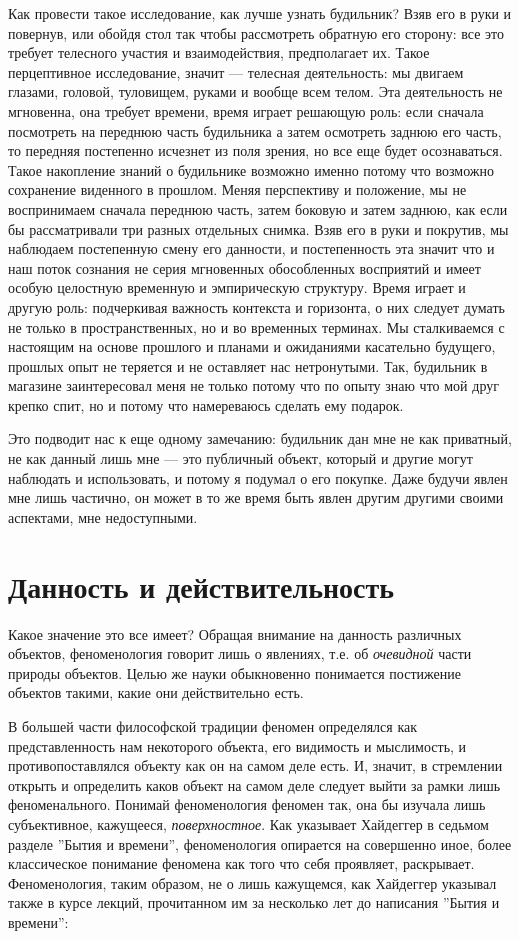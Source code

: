 \documentclass[11pt]{book}
\begin{document}
Как провести такое исследование, как лучше узнать будильник? Взяв его в руки и повернув, или обойдя стол так чтобы рассмотреть обратную его сторону: все это требует телесного участия и взаимодействия, предполагает их. Такое перцептивное исследование, значит --- телесная деятельность: мы двигаем глазами, головой, туловищем, руками и вообще всем телом. Эта деятельность не мгновенна, она требует времени, время играет решающую роль: если сначала посмотреть на переднюю часть будильника а затем осмотреть заднюю его часть, то передняя постепенно исчезнет из поля зрения, но все еще будет осознаваться. Такое накопление знаний о будильнике возможно именно потому что возможно сохранение виденного в прошлом. Меняя перспективу и положение, мы не воспринимаем сначала переднюю часть, затем боковую и затем заднюю, как если бы рассматривали три разных отдельных снимка. Взяв его в руки и покрутив, мы наблюдаем постепенную смену его данности, и постепенность эта значит что и наш поток сознания не серия мгновенных обособленных восприятий и имеет особую целостную временную и эмпирическую структуру. Время играет и другую роль: подчеркивая важность контекста и горизонта, о них следует думать не только в пространственных, но и во временных терминах. Мы сталкиваемся с настоящим на основе прошлого и планами и ожиданиями касательно будущего, прошлых опыт не теряется и не оставляет нас нетронутыми. Так, будильник в магазине заинтересовал меня не только потому что по опыту знаю что мой друг крепко спит, но и потому что намереваюсь сделать ему подарок.

Это подводит нас к еще одному замечанию: будильник дан мне не как приватный, не как данный лишь мне --- это публичный объект, который и другие могут наблюдать и использовать, и потому я подумал о его покупке. Даже будучи явлен мне лишь частично, он может в то же время быть явлен другим другими своими аспектами, мне недоступными.

\section{Данность и действительность}

Какое значение это все имеет? Обращая внимание на данность различных объектов, феноменология говорит лишь о явлениях, т.е. об \textit{очевидной} части природы объектов. Целью же науки обыкновенно понимается постижение объектов такими, какие они действительно есть.

В большей части философской традиции феномен определялся как представленность нам некоторого объекта, его видимость и мыслимость, и противопоставлялся объекту как он на самом деле есть. И, значит, в стремлении открыть и определить каков объект на самом деле следует выйти за рамки лишь феноменального. Понимай феноменология феномен так, она бы изучала лишь субъективное, кажущееся, \textit{поверхностное}. Как указывает Хайдеггер в седьмом разделе ''Бытия и времени'', феноменология опирается на совершенно иное, более классическое понимание феномена как того что себя проявляет, раскрывает. Феноменология, таким образом, не о лишь кажущемся, как Хайдеггер указывал также в курсе лекций, прочитанном им за несколько лет до написания ''Бытия и времени'':
\end{document}
